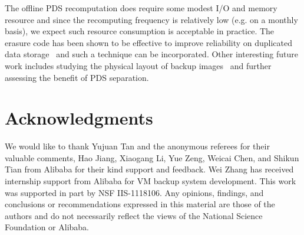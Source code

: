 The offline PDS recomputation does require some modest I/O and memory resource and 
since the recomputing frequency is relatively low (e.g. on a monthly basis), we expect such resource
consumption is acceptable in practice.
The erasure code has been shown to be effective  to improve reliability on duplicated data 
storage~\cite{Li2011} and such a technique can be incorporated.
Other interesting future work includes
studying the physical layout of backup images~\cite{SmaldoneWH13} and 
further assessing the benefit of PDS separation.






\section*{Acknowledgments}
{
We would like to thank Yujuan Tan and the anonymous referees for their valuable comments,
Hao Jiang, Xiaogang Li, Yue Zeng, Weicai Chen, and Shikun Tian from Alibaba for their kind support and feedback. 
Wei Zhang has received internship support from Alibaba  for VM backup system development.
This work was supported in part by NSF IIS-1118106.
Any opinions, findings, and conclusions or recommendations expressed in this material are those of the authors and
do not necessarily reflect the views of the National Science Foundation or Alibaba.
}




